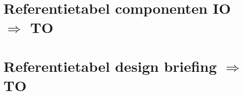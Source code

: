 \section{Referentietabel componenten IO $\Rightarrow$ TO}\label{ioto}

\begin{multicols}{2}

\end{multicols}

\section{Referentietabel design briefing $\Rightarrow$ TO}\label{dbto}

\begin{multicols}{2}

\end{multicols}

